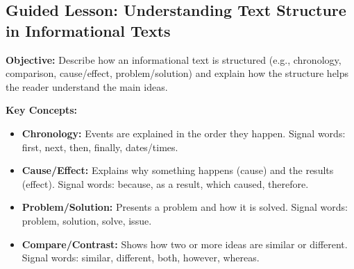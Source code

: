 \documentclass[12pt]{article}
\begin{document}
\subsection*{Guided Lesson: Understanding Text Structure in Informational Texts}
\onehalfspacing

\begin{tcolorbox}[colframe=black!40, colback=gray!5, 
coltitle=black, colbacktitle=black!20, fonttitle=\bfseries\Large, 
title=Learning Objective, halign title=center, left=5pt, right=5pt, top=5pt, bottom=15pt]
\textbf{Objective:} Describe how an informational text is structured (e.g., chronology, comparison, cause/effect, problem/solution) and explain how the structure helps the reader understand the main ideas.
\end{tcolorbox}

\vspace{1em}

\begin{tcolorbox}[colframe=black!60, colback=white, 
coltitle=black, colbacktitle=black!15, fonttitle=\bfseries\Large, 
title=Key Concepts and Vocabulary, halign title=center, left=10pt, right=10pt, top=10pt, bottom=15pt]
\textbf{Key Concepts:}
\begin{itemize}
    \item \textbf{Chronology:} Events are explained in the order they happen. Signal words: first, next, then, finally, dates/times.
    \item \textbf{Cause/Effect:} Explains why something happens (cause) and the results (effect). Signal words: because, as a result, which caused, therefore.
    \item \textbf{Problem/Solution:} Presents a problem and how it is solved. Signal words: problem, solution, solve, issue.
    \item \textbf{Compare/Contrast:} Shows how two or more ideas are similar or different. Signal words: similar, different, both, however, whereas.
\end{itemize}
\end{tcolorbox}

\vspace{5cm}
\end{document}
